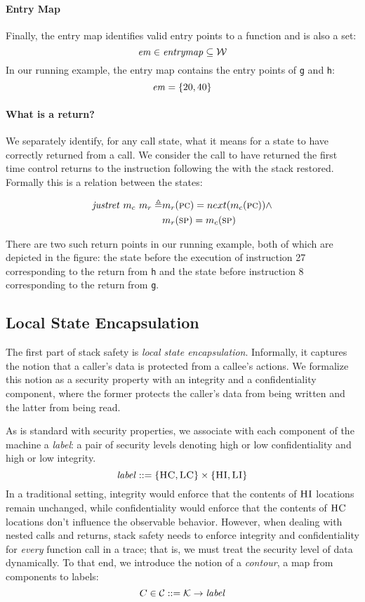 \documentclass[acmsmall,review,anonymous]{acmart}\settopmatter{printfolios=true,printccs=false,printacmref=false}
\begin{document}
\paragraph*{Entry Map}
Finally, the entry map identifies valid entry points to a
function and is also a set:
\[\mathit{em} \in \mathit{entrymap} \subseteq {\mathcal W}\]
%
In our running example, the entry map contains the entry
points of {\tt g} and {\tt h}:
\[ \mathit{em} = \{20, 40\} \]

\paragraph*{What is a return?}

We separately identify, for any call state, what it means for a state
to have correctly returned from a call. We consider the call to have
returned the first time control returns to the instruction following
the \jal with the stack restored. Formally this is a relation
between the states:

\[\begin{split}
    \mathit{justret}\ m_c\ m_r \triangleq & m_r(\textsc{pc}) =
    next(m_c(\textsc{pc})) \land \\ & m_r(\textsc{sp}) = m_c(\textsc{sp})
\end{split}\]

There are two such return points in our running example, both of which
are depicted in the figure: the state before the execution of
instruction 27 corresponding to the return from {\tt h} and the state
before instruction 8 corresponding to the return from {\tt g}.

\subsection{Local State Encapsulation}
\label{sec:lse}

The first part of stack safety is {\em local state encapsulation}.
Informally, it captures the notion that a caller's data is
protected from a callee's actions. We formalize this notion
as a security property with an integrity and a confidentiality
component, where the former protects the caller's data from being
written and the latter from being read.

As is standard with security properties, we associate with each
component of the machine a {\em label}: a pair of security levels
denoting high or low confidentiality and high or low integrity.
%
\[\mathit{label} ::= \{\textsc{HC},\textsc{LC}\} \times \{\textsc{HI},\textsc{LI}\}\]
%
In a traditional setting, integrity would enforce that the contents of
$\textsc{HI}$ locations remain unchanged, while confidentiality would
enforce that the contents of $\textsc{HC}$ locations don't influence the
observable behavior. However, when dealing with nested calls and
returns, stack safety needs to enforce integrity and confidentiality
for {\em every} function call in a trace; that is, we must treat the
security level of data dynamically.
%
To that end, we introduce the notion of a {\em contour}, a map from
components to labels:
%
\[C \in {\mathcal C} ::= {\mathcal K} \rightarrow \mathit{label}\]
\end{document}
